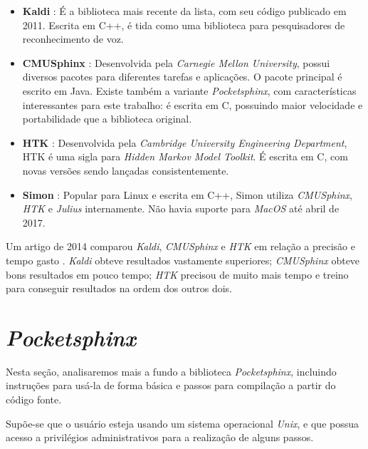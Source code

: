 \begin{itemize}
\item \textbf{Kaldi} \citep{kaldi}: É a biblioteca mais recente da lista, com seu código publicado em 2011. Escrita em C++, é tida como uma biblioteca para pesquisadores de reconhecimento de voz.

\item \textbf{CMUSphinx} \citep{cmusphinx}: Desenvolvida pela \textit{Carnegie Mellon University}, possui diversos pacotes para diferentes tarefas e aplicações. O pacote principal é escrito em Java. Existe também a variante \emph{Pocketsphinx}, com características interessantes para este trabalho: é escrita em C, possuindo maior velocidade e portabilidade que a biblioteca original.

\item \textbf{HTK} \citep{htk}: Desenvolvida pela \textit{Cambridge University Engineering Department}, HTK é uma sigla para \textit{Hidden Markov Model Toolkit}. É escrita em C, com novas versões sendo lançadas consistentemente.

\item \textbf{Simon} \citep{Simon}: Popular para Linux e escrita em C++, Simon utiliza \textit{CMUSphinx}, \textit{HTK} e \textit{Julius} internamente. Não havia suporte para \textit{MacOS} até abril de 2017.
\end{itemize}

Um artigo de 2014 comparou \emph{Kaldi}, \emph{CMUSphinx} e \emph{HTK} em relação a precisão e tempo gasto \citep{compareSpeech}. \emph{Kaldi} obteve resultados vastamente superiores; \emph{CMUSphinx} obteve bons resultados em pouco tempo; \emph{HTK} precisou de muito mais tempo e treino para conseguir resultados na ordem dos outros dois.


\section{\emph{Pocketsphinx}}

Nesta seção, analisaremos mais a fundo a biblioteca \textit{Pocketsphinx}, incluindo instruções para usá-la de forma básica e passos para compilação a partir do código fonte.

Supõe-se que o usuário esteja usando um sistema operacional \textit{Unix}, e que possua acesso a privilégios administrativos para a realização de alguns passos.

